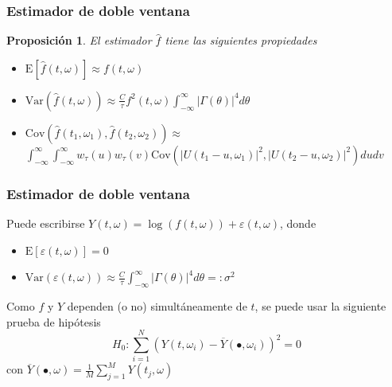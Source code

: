 \documentclass[11pt]{beamer}
\newtheorem{prop}{Proposición}
\newcommand{\intR}{\int_{-\infty}^{\infty}}
\newcommand{\est}[1]{\widehat{ #1 }}
\newcommand{\E}[1]{\mathrm{E}\left[ #1 \right]}
\newcommand{\Var}[1]{\mathrm{Var}\left( #1 \right)}
\newcommand{\Cov}[1]{\mathrm{Cov}\left( #1 \right)}
\newcommand{\abso}[1]{\left| #1 \right|}
\begin{document}

\begin{frame}\frametitle{Estimador de doble ventana}
\begin{prop}
El estimador $\widehat{f}$ tiene las siguientes propiedades
\begin{itemize}
\item $\displaystyle \E{\est{f}(t,\omega)} \approx f(t,\omega)$
\item $\displaystyle \Var{\est{f}(t,\omega)} \approx 
\frac{C}{\tau} f^{2}(t,\omega) \intR \abso{\Gamma (\theta)}^{4} d\theta$
\item $\displaystyle \Cov{\est{f}(t_1,\omega_1) , \est{f}(t_2,\omega_2)} \approx $
{\small $\intR \intR
w_\tau (u) w_\tau(v) \Cov{ \abso{U(t_1-u,\omega_1)}^{2} , \abso{U(t_2-u,\omega_2)}^{2} } du dv$
}
\end{itemize}
\end{prop}
\end{frame}


\begin{frame}\frametitle{Estimador de doble ventana}
Puede escribirse
$Y(t,\omega) = \log \left( f(t,\omega) \right) + \varepsilon(t,\omega)$, 
donde 
\begin{itemize}
\item $\displaystyle \E{\varepsilon(t,\omega)} = 0$
\item $\displaystyle \Var{\varepsilon(t,\omega)}
\approx \frac{C}{\tau} \intR \abso{\Gamma (\theta)}^{4} d\theta =: \sigma^{2}$
\end{itemize}

Como $f$ y $Y$  dependen (o no) simultáneamente de $t$, se puede usar 
la siguiente prueba de hipótesis
\begin{equation*}
H_0 : \sum_{i = 1 }^{N} \left( Y(t,\omega_i) - \overline{Y}(\bullet,\omega_i) \right)^{2} 
= 0
\end{equation*}
con $\overline{Y}(\bullet,\omega) = \frac{1}{M} \sum_{j=1}^{M} Y(t_j,\omega)$
\end{frame}

\end{document}
